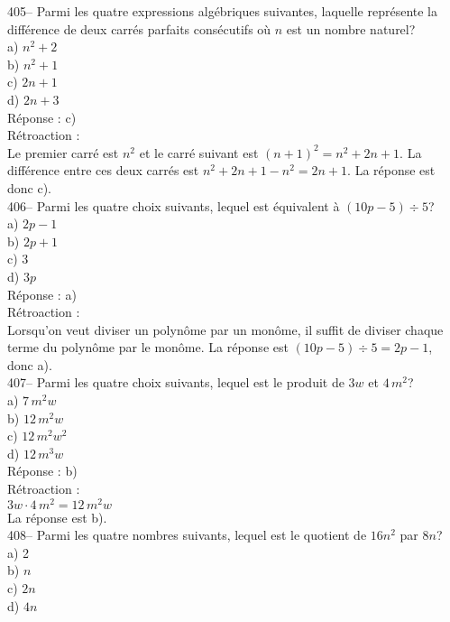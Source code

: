﻿\documentclass[letterpaper, 12pt]{article}
\begin{document}
405-- Parmi les quatre expressions alg\'ebriques suivantes, laquelle
repr\'esente la diff\'erence de deux carr\'es parfaits cons\'ecutifs o\`u
$n$ est un nombre naturel?\\
a) $n^{2}+2$\\
b) $n^{2}+1$\\
c) $2n+1$\\
d) $2n+3$\\

R\'eponse : c)\\

R\'etroaction : \\
Le premier carr\'e est $n^{2}$ et le carr\'e suivant est $\left( n+1\right)
^{2}=n^{2}+2n+1$.  La diff\'erence entre ces deux carr\'es est
$n^{2}+2n+1-n^{2}=2n+1$.  La r\'eponse est donc c).\\

406--  Parmi les quatre choix suivants, lequel est \'equivalent \`a $\left(
10p-5\right) \div 5$?\\
a) $2p-1$\\
b) $2p+1$\\
c) 3\\
d) $3p$\\

R\'eponse : a)\\

R\'etroaction : \\
Lorsqu'on veut diviser un polyn\^ome par un mon\^ome, il suffit de diviser
chaque terme du polyn\^ome par le mon\^ome.  La r\'eponse est $\left(
10p-5\right) \div 5=2p-1$, donc a).\\



407-- Parmi les quatre choix suivants, lequel est le produit de $3w$ et
$4\,m^{2}$?\\
a) $7\,m^{2}w$\\
b) $12\,m^{2}w$ \\
c) $12\,m^{2}w^{2}$\\
d) $12\,m^{3}w$\\

R\'eponse : b)\\

R\'etroaction : \\
$3w\cdot 4\,m^{2}=12\,m^{2}w$\\
La r\'eponse est b).\\

408-- Parmi les quatre nombres suivants, lequel est le quotient de $16n^{2}$
par $8n$?\\
a) 2\\
b) $n$\\
c) $2n$\\
d) $4n$\\
\end{document}
